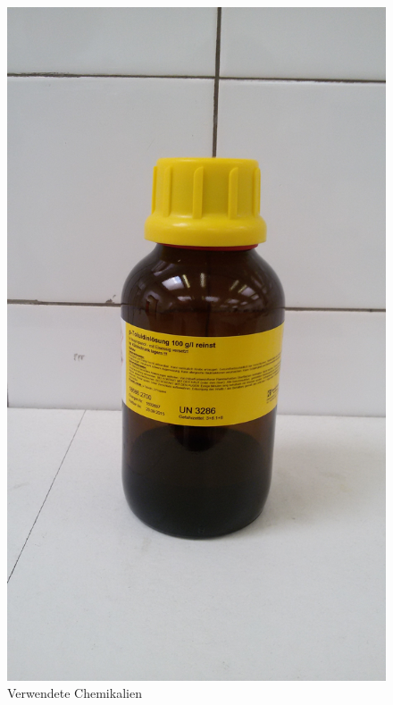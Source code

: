 \begin{figure}[htbp]
	\centering
		\includegraphics[width=1.00\textwidth]{../Bilder/20150504_140919.jpg}
	\caption{Verwendete Chemikalien}
	\label{fig:Chemikalien}
\end{figure}

